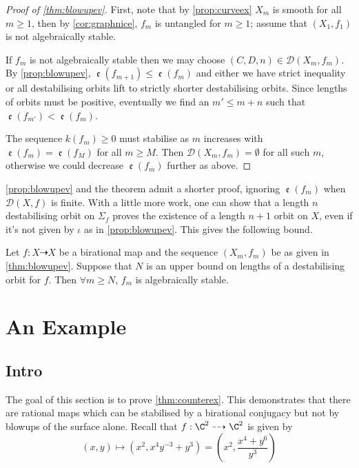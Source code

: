\documentclass[11pt, final]{amsart}
\newcommand{\dashto}{\dashrightarrow}
\newcommand{\emp}{\emptyset}
\newcommand{\sgraph}{\Sigma}
\newcommand{\nice}{untangled}
\DeclareMathOperator{\comp}{\mathfrak e}
\begin{document}
\begin{proof}[Proof of \autoref{thm:blowupev}]
 First, note that by \autoref{prop:curveex} $X_m$ is smooth for all $m \ge 1$, then by \autoref{cor:graphnice}, $f_m$ is \nice{} for $m \ge 1$; assume that $(X_1, f_1)$ is not algebraically stable.
 
 If $f_m$ is not algebraically stable then we may choose $(C, D, n) \in \mathcal D(X_m, f_m)$. By \autoref{prop:blowupev}, $\comp(f_{m+1}) \le \comp(f_m)$ and either we have strict inequality or all destabilising orbits lift to strictly shorter destabilising orbits. Since lengths of orbits must be positive, eventually we find an $m' \le m+n$ such that $\comp(f_{m'}) < \comp(f_m)$.
 
 The sequence $k(f_m) \ge 0$ must stabilise as $m$ increases with $\comp(f_m) = \comp(f_M)$ for all $m \ge M$. Then $\mathcal D(X_m, f_m) = \emp$ for all such $m$, otherwise we could decrease $\comp(f_m)$ further as above.
\end{proof}

\autoref{prop:blowupev} and the theorem admit a shorter proof, ignoring $\comp(f_m)$ when $\mathcal D(X, f)$ is finite. 
 With a little more work, one can show that a length $n$ destabilising orbit on $\sgraph_f$ proves the existence of a length $n+1$ orbit on $X$, even if it's not given by $\iota$ as in \autoref{prop:blowupev}. This gives the following bound.

\begin{cor}
Let $f : X \dashto X$ be a birational map and the sequence $(X_m, f_m)$ be as given in \autoref{thm:blowupev}. Suppose that $N$ is an upper bound on lengths of a destabilising orbit for $f$. Then $\forall m \ge N$, $f_m$ is algebraically stable.
\end{cor}

\section{An Example}\label{sec:counterex}

\subsection{Intro}

The goal of this section is to prove \autoref{thm:counterex}. 
This demonstrates that there are rational maps which can be stabilised by a birational conjugacy but not by blowups of the surface alone. 
Recall that $f : \C^2 \dashto \C^2$ is given by \[(x, y) \longmapsto (x^2, x^4y^{-3} + y^3) = \left(x^2, \frac{x^4 + y^6}{y^3}\right)\]
\end{document}

